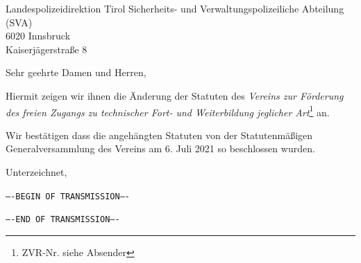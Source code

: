 \documentclass[a4paper,DIV=15,parskip=full,10pt]{scrartcl}
\begin{document}
\begin{letter}{Landespolizeidirektion Tirol Sicherheits- und Verwaltungspolizeiliche Abteilung (SVA)\\6020 Innsbruck\\Kaiserjägerstraße 8}
  \opening{Sehr geehrte Damen und Herren,}

  Hiermit zeigen wir ihnen die Änderung der Statuten des \textit{Vereins
    zur Förderung des freien Zugangs zu technischer Fort- und Weiterbildung
    jeglicher Art}\footnote{ZVR-Nr. siehe Absender} an.

  Wir bestätigen dass die angehängten Statuten von der Statutenmäßigen
  Generalversammlung des Vereins am 6. Juli 2021 so beschlossen wurden.


\closing{Unterzeichnet,}

\afterpage{\null\thispagestyle{empty}\addtocounter{page}{-1}\newpage}

\setcounter{page}{0}
\newpage
\texttt{----BEGIN OF TRANSMISSION----}



\vspace{1em}
\texttt{----END OF TRANSMISSION----}

\end{letter}
\end{document}
